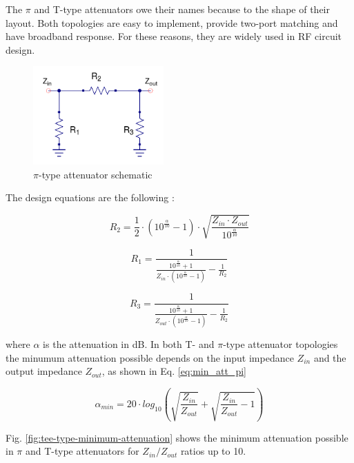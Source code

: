 \noindent The $\pi$ and T-type attenuators owe their names because to the shape of their layout. Both topologies are easy to implement, provide two-port matching and have broadband response. For these reasons, they are widely used in RF circuit design.

  \begin{figure}[ht]
    \centering
    \includegraphics[width=5cm]{./images/pi-attenuator-schematic.png}
    \caption{$\pi$-type attenuator schematic}
    \label{fig:pi-type-attenuator-schematic}
  \end{figure}
  
\noindent The design equations are the following \cite{vizmuller1995rf}:

\begin{equation}
	R_2 = \frac{1}{2} \cdot (10^{\frac{\alpha}{10}} - 1) \cdot \sqrt{\frac{Z_{in} \cdot Z_{out}}{10^{\frac{\alpha}{10}}}}
\end{equation}

\begin{equation}
	R_1 = \frac{1} {\frac{10^{\frac{\alpha}{10}}+1}{Z_{in} \cdot (10^{\frac{\alpha}{10}} - 1)} - \frac{1}{R_2}}
\end{equation}

\begin{equation}
	R_3 = \frac{1} {\frac{10^{\frac{\alpha}{10}}+1}{Z_{out} \cdot (10^{\frac{\alpha}{10}} - 1)} - \frac{1}{R_2}}
\end{equation}


\noindent where $\alpha$ is the attenuation in dB. In both T- and $\pi$-type attenuator topologies the minumum attenuation possible depends on the input impedance $Z_{in}$ and the output impedance $Z_{out}$, as shown in Eq. \ref{eq:min_att_pi}

\begin{equation}
	\alpha_{min} = 20 \cdot log_{10} \left( \sqrt{\frac{Z_{in}}{Z_{out}}} + \sqrt{\frac{Z_{in}}{Z_{out}}-1} \right)
	\label{eq:min_att_pi}
\end{equation}


\noindent Fig. \ref{fig:tee-type-minimum-attenuation} shows the minimum attenuation possible in $\pi$ and T-type attenuators for $Z_{in} / Z_{out}$ ratios up to 10.
  
